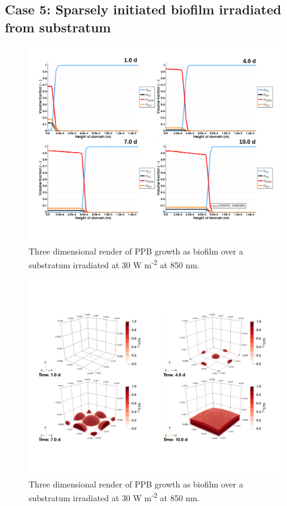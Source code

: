 \subsection{Case 5: Sparsely initiated biofilm irradiated from substratum}
\begin{figure}[H]
    \centering
    \includegraphics[width=\textwidth,height=0.5\textheight]{Chap4/results/post_processing/renders/case5_3D/case5_3D_dist.pdf}
    \caption{Three dimensional render of PPB growth as biofilm over a substratum irradiated at 30 W m\textsuperscript{-2} at 850 nm. } 
    \label{fig:case5_alpha_distro}
\end{figure}


\begin{figure}[tp]
    \centering
    \includegraphics[width=\textwidth,height=0.5\textheight]{Chap4/results/post_processing/renders/case5_3D/case5_3D_ppb.pdf}
    \caption{Three dimensional render of PPB growth as biofilm over a substratum irradiated at 30 W m\textsuperscript{-2} at 850 nm. } 
    \label{fig:case5_3D_ppb}
\end{figure}


